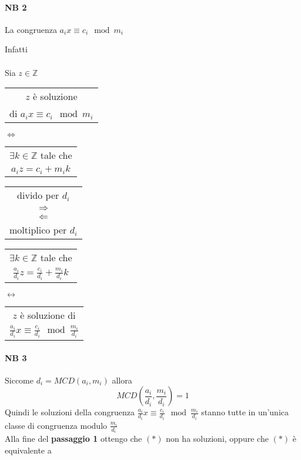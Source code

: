 \paragraph{NB 2} La congruenza $a_ix\equiv c_i \mod m_i$\\

{\color{blue}
    Infatti\\\\
    Sia $z\in\mathbb{Z}$
    \begin{center}
        \begin{tabular}{|c|}
            \hline
            $z$ è soluzione\\
            di $a_ix\equiv c_i \mod m_i$\\
            \hline
        \end{tabular}
        $\Longleftrightarrow$
        \begin{tabular}{|c|}
            \hline
            $\exists k\in\mathbb{Z}$ tale che \\
            $a_iz=c_i+m_ik$\\                             %
            \hline
        \end{tabular}
    \end{center}
}
\begin{tabular}{c}
    {\color{green}divido per $d_i$}\\
    {\color{green}$\Longrightarrow$}\\
    {\color{orange}$\Longleftarrow$}\\
    {\color{orange}moltiplico per $d_i$}\\
\end{tabular}
{\color{blue}
    \begin{tabular}{|c|}
        \hline
            $\exists k\in\mathbb{Z}$ tale che\\
            $\frac{a_i}{d_i}z=\frac{c_i}{d_i}+\frac{m_i}{d_i}k$\\
        \hline
    \end{tabular}
    $\longleftrightarrow$
    \begin{tabular}{|c|}
        \hline
            $z$ è soluzione di \\
            $\frac{a_i}{d_i}x\equiv \frac{c_i}{d_i}\mod \frac{m_i}{d_i}$\\
        \hline
    \end{tabular}
}

\paragraph{NB 3} Siccome $d_i=MCD(a_i, m_i)$ allora
$$MCD(\frac{a_i}{d_i},\frac{m_i}{d_i})=1$$
Quindi le soluzioni della congruenza $\frac{a_i}{d_i}x\equiv \frac{c_i}{d_i}\mod\frac{m_i}{d_i}$
stanno tutte in un'unica classe di congruenza modulo $\frac{m_i}{d_i}$\\
Alla fine del \textbf{passaggio 1} ottengo che $(*)$ non ha soluzioni, oppure che $(*)$ è equivalente a 


